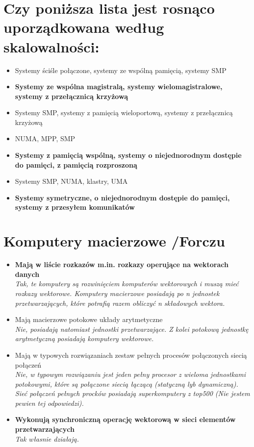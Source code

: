 \documentclass[a4paper,twoside]{article}
\begin{document}
\section{Czy poniższa lista jest rosnąco uporządkowana według skalowalności:}
	\begin{itemize}
    \item Systemy ściśle połączone, systemy ze wspólną pamięcią, systemy SMP
    \item \textbf{Systemy ze wspólna magistralą, systemy wielomagistralowe, systemy z przełącznicą krzyżową}
    \item Systemy SMP, systemy z pamięcią wieloportową, systemy z przełącznicą krzyżową
    \item NUMA, MPP, SMP
    \item \textbf{Systemy z pamięcią wspólną, systemy o niejednorodnym dostępie do pamięci, z pamięcią rozproszoną}
    \item Systemy SMP, NUMA, klastry, UMA
    \item \textbf{Systemy symetryczne, o niejednorodnym dostępie do pamięci, systemy z przesyłem komunikatów}
    \end{itemize}
    
\section{Komputery macierzowe {\small /Forczu}}
	\begin{itemize}
    \item \textbf{Mają w liście rozkazów m.in. rozkazy operujące na wektorach danych}\\
    {\small \emph{Tak, te komputery są rozwinięciem komputerów wektorowych i muszą mieć rozkazy wektorowe. Komputery macierzowe posiadają po \emph{n} jednostek przetwarzających, które potrafią razem obliczyć \emph{n} składowych wektora.}}
    \item Mają macierzowe potokowe układy arytmetyczne\\
    {\small \emph{Nie, posiadają natomiast jednostki przetwarzające. Z kolei potokową jednostkę arytmetyczną posiadają komputery wektorowe.}}
    \item Mają w typowych rozwiązaniach zestaw pełnych procesów połączonych siecią połączeń\\
    {\small \emph{Nie, w typowym rozwiązaniu jest jeden pełny procesor z wieloma jednostkami potokowymi, które są połączone siecią łączącą (statyczną lyb dynamiczną). Sieć połączeń pełnych procków posiadają superkomputery z top500 (Nie jestem pewien tej odpowiedzi).}}
    \item \textbf{Wykonują synchroniczną operację wektorową w sieci elementów przetwarzających}\\
    {\small \emph{Tak własnie działają.}}
    \end{itemize}
    
\end{document}
